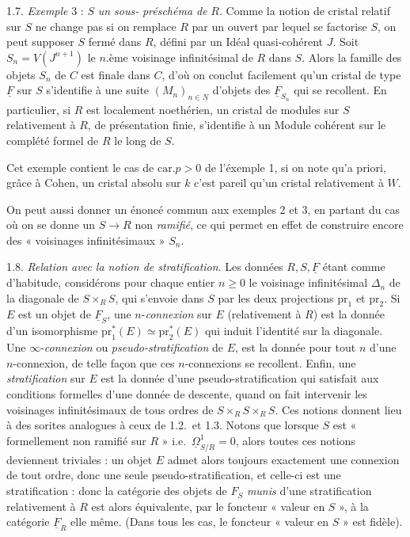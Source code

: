\documentclass[11pt,a4paper]{article}
\begin{document}
1.7.  \emph{Exemple} 3 :
$S$ \emph{un sous-} \emph{préschéma de} $R$. Comme la notion de cristal relatif sur $S$ ne
change pas si on remplace $R$ par un ouvert par lequel se factorise $S$, on peut
supposer $S$ fermé dans $R$, défini par un Idéal quasi-cohérent $J$. Soit
$S_n=V(J^{n+1})$ le $n$.ème voisinage infinitésimal de $R$ dans
$S$. Alors la famille des objets $S_n$
de $C$ est finale dans $C$, d'où on conclut facilement qu'un cristal de type
$\underline{F}$ sur $S$ s'identifie à une suite $(M_n)_{n\in\underline{N}}$
d'objets des $\underline{F}_{S_n}$ qui se recollent. En particulier, si $R$ est
localement noethérien, un cristal de modules sur $S$ relativement à $R$, de
présentation finie, s'identifie à un Module cohérent sur le complété formel de
$R$ le long de $S$.

Cet exemple contient le cas de $\mathrm{car}.p>0$ de l'éxemple 1, si on note
qu'a priori, grâce à Cohen, un cristal absolu sur $k$\add{,} c'est pareil
qu'un cristal relativement à $W$.

On peut aussi donner un énoncé commun aux exemples 2 et 3, en partant du cas
où on se donne un $S\to R$ non \emph{ramifié}, ce qui permet en effet de
construire encore des « voisinages infinitésimaux » $S_n$.

1.8. \emph{Relation avec la notion de stratification}. Les données
$R,S,\underline{F}$ étant comme d'habitude, considérons pour chaque entier
$n\geqslant 0$ le voisinage infinitésimal $\Delta_n$ de la diagonale de
$S\times_R S$, qui s'envoie dans $S$ par les deux projections
$\mathrm{pr}_1$ et $\mathrm{pr}_2$. Si $E$ est un objet de
$\underline{F}_S$, une $n$-\emph{connexion} sur $E$ (relativement à $R$) est
la donnée d'un isomorphisme $\mathrm{pr}_1^*(E)\simeq\mathrm{pr}_2^*(E)$ qui
induit l'identité sur la diagonale. Une $\infty$-\emph{connexion} ou
\emph{pseudo-stratification} de $E$, est la donnée pour tout $n$ d'une
$n$-connexion, de telle façon que ces $n$-connexions se recollent. Enfin, une
\emph{stratification} sur $E$ est la donnée d'une pseudo-stratification qui
satisfait aux conditions formelles d'une donnée de descente, quand on fait
intervenir les voisinages infinitésimaux de tous ordres de  $S\times_R S\times_R S$. Ces notions donnent lieu à des sorites analogues à
ceux de 1.2.\ et 1.3. Notons que lorsque $S$ est « formellement non ramifié
sur $R$ » i.e.\ $\underline{\Omega}^1_{S/R}=0$, alors toutes ces notions
deviennent triviales : un objet $E$ admet alors toujours exactement une
connexion de tout ordre, donc une seule pseudo-stratification, et celle-ci est
une stratification : donc la catégorie des objets de $F_S$ \emph{munis} d'une
stratification relativement à $R$ est alors équivalente, par le foncteur
« valeur en $S$ », à la catégorie $\underline{F}_R$ elle même. (Dans tous les cas, le foncteur
« valeur en $S$ » est  fidèle).
\end{document}
